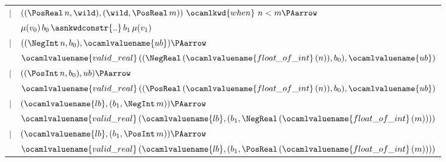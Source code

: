 \begin{tabular}{rl}
           $\mid$
             & $((\PosReal \, n, \wild), (\wild, \PosReal \, m))
               \,\, \ocamlkwd{when} \,\, n < m \PAarrow$\\
             & \hspace*{3mm}
               $\mu(v_0) \, b_0 \, \asnkwdconstr{..} \, b_1 \,
               \mu(v_1)$\\ 
           $\mid$
             & $((\NegInt \, n, b_0), \ocamlvaluename{ub}) \PAarrow$\\
             & \hspace*{3mm}
               $\ocamlvaluename{valid\_real} \, ((\NegReal \,
               (\ocamlvaluename{float\_of\_int} \, (n)), b_0),
               \ocamlvaluename{ub})$\\
           $\mid$
             & $((\PosInt \, n, b_0), ub) \PAarrow$\\
             & \hspace*{3mm}
               $\ocamlvaluename{valid\_real} \, ((\PosReal \,
               (\ocamlvaluename{float\_of\_int} \, (n)), b_0),
               \ocamlvaluename{ub})$\\
           $\mid$
             & $(\ocamlvaluename{lb}, (b_1, \NegInt \, m)) \PAarrow$\\
             & \hspace*{3mm}
               $\ocamlvaluename{valid\_real} \,
               (\ocamlvaluename{lb}, (b_1, \NegReal \,
               (\ocamlvaluename{float\_of\_int} \, (m))))$\\
           $\mid$
             & $(\ocamlvaluename{lb}, (b_1, \PosInt \, m)) \PAarrow$\\
             & \hspace*{3mm}
               $\ocamlvaluename{valid\_real} \,
               (\ocamlvaluename{lb}, (b_1, \PosReal \,
               (\ocamlvaluename{float\_of\_int} \, (m))))$
        \end{tabular} \\

